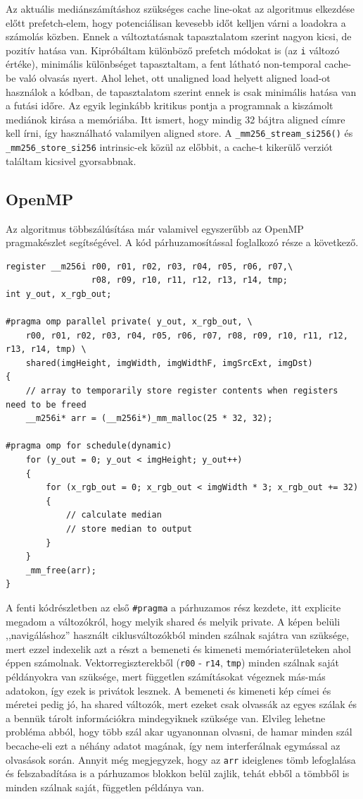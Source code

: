 			Az aktuális mediánszámításhoz szükséges cache line-okat az algoritmus elkezdése előtt prefetch-elem, hogy potenciálisan kevesebb időt kelljen várni a loadokra a számolás közben. Ennek a változtatásnak tapasztalatom szerint nagyon kicsi, de pozitív hatása van. Kipróbáltam különböző prefetch módokat is (az \verb|i| változó értéke), minimális különbséget tapasztaltam, a fent látható non-temporal cache-be való olvasás nyert. Ahol lehet, ott unaligned load helyett aligned load-ot használok a kódban, de tapasztalatom szerint ennek is csak minimális hatása van a futási időre. Az egyik leginkább kritikus pontja a programnak a kiszámolt mediánok kirása a memóriába. Itt ismert, hogy mindig 32 bájtra aligned címre kell írni, így használható valamilyen aligned store. A \verb|_mm256_stream_si256()| és \verb|_mm256_store_si256| intrinsic-ek közül az előbbit, a cache-t kikerülő verziót találtam kicsivel gyorsabbnak.
		\subsection{OpenMP}
			Az algoritmus többszálúsítása már valamivel egyszerűbb az OpenMP pragmakészlet segítségével. A kód párhuzamosítással foglalkozó része a következő.
			\begin{lstlisting}
register __m256i r00, r01, r02, r03, r04, r05, r06, r07,\
				 r08, r09, r10, r11, r12, r13, r14, tmp;
int y_out, x_rgb_out;

#pragma omp parallel private( y_out, x_rgb_out, \
	r00, r01, r02, r03, r04, r05, r06, r07, r08, r09, r10, r11, r12, r13, r14, tmp) \
	shared(imgHeight, imgWidth, imgWidthF, imgSrcExt, imgDst)
{
	// array to temporarily store register contents when registers need to be freed
	__m256i* arr = (__m256i*)_mm_malloc(25 * 32, 32);

#pragma omp for schedule(dynamic)
	for (y_out = 0; y_out < imgHeight; y_out++)
	{
		for (x_rgb_out = 0; x_rgb_out < imgWidth * 3; x_rgb_out += 32)
		{
			// calculate median
			// store median to output
		}
	}
	_mm_free(arr);
}\end{lstlisting}

			A fenti kódrészletben az első \verb|#pragma| a párhuzamos rész kezdete, itt explicite megadom a változókról, hogy melyik shared és melyik private. A képen belüli ,,navigáláshoz'' használt ciklusváltozókból minden szálnak sajátra van szüksége, mert ezzel indexelik azt a részt a bemeneti és kimeneti memóriaterületeken ahol éppen számolnak. Vektorregiszterekből (\verb|r00| - \verb|r14|, \verb|tmp|) minden szálnak saját példányokra van szüksége, mert független számításokat végeznek más-más adatokon, így ezek is privátok lesznek. A bemeneti és kimeneti kép címei és méretei pedig jó, ha shared változók, mert ezeket csak olvassák az egyes szálak és a bennük tárolt információkra mindegyiknek szüksége van. Elvileg lehetne probléma abból, hogy több szál akar ugyanonnan olvasni, de hamar minden szál becache-eli ezt a néhány adatot magának, így nem interferálnak egymással az olvasások során. Annyit még megjegyzek, hogy az \verb|arr| ideiglenes tömb lefoglalása és felszabadítása is a párhuzamos blokkon belül zajlik, tehát ebből a tömbből is minden szálnak saját, független példánya van.

